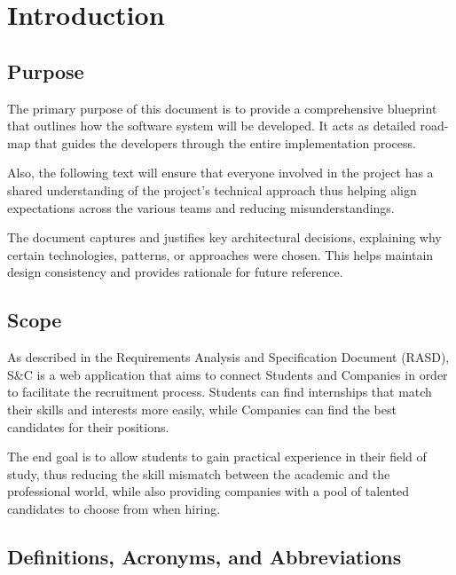 \chapter{Introduction}
\label{chap:Introduction}%

\section{Purpose}
\label{sec:Purpose}%

\par The primary purpose of this document is to provide a comprehensive blueprint that outlines how the software system
will be developed. It acts as detailed road-map that guides the developers through the entire implementation process.

\par Also, the following text will ensure that everyone involved in the project has a shared understanding of the
project's technical approach thus helping align expectations across the various teams and reducing misunderstandings.

\par The document captures and justifies key architectural decisions, explaining why certain technologies, patterns, or
approaches were chosen. This helps maintain design consistency and provides rationale for future reference.

\section{Scope}
\label{sec:Scope}%

\par As described in the Requirements Analysis and Specification Document (RASD), S\&C is a web application that aims
to connect Students and Companies in order to facilitate the recruitment process. Students can find internships that
match their skills and interests more easily, while Companies can find the best candidates for their positions.

\par The end goal is to allow students to gain practical experience in their field of study, thus reducing the skill
mismatch between the academic and the professional world, while also providing companies with a pool of talented
candidates to choose from when hiring.

\section{Definitions, Acronyms, and Abbreviations}
\label{sec:definitions-acronyms-abbreviations}%

